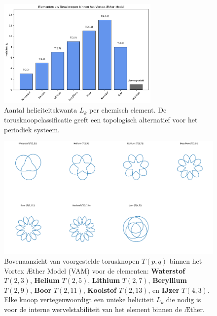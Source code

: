 \begin{figure}[H]
    \centering
    \includegraphics[width=0.7\textwidth]{sections/2_elementenTorusknopen}
    \caption{Aantal heliciteitskwanta $L_k$ per chemisch element. De torusknoopclassificatie geeft een topologisch alternatief voor het periodiek systeem.}
    \label{fig:elementen_torusknoop}
\end{figure}

\begin{figure}[H]
    \centering
    \includegraphics[width=\textwidth]{sections/0_eersteKnopen}
    \caption[Torusknopen voor lichte elementen (bovenaanzicht)]{
        Bovenaanzicht van voorgestelde torusknopen \( T(p, q) \) binnen het Vortex Æther Model (VAM) voor de elementen:
        \textbf{Waterstof} \(T(2,3)\),
        \textbf{Helium} \(T(2,5)\),
        \textbf{Lithium} \(T(2,7)\),
        \textbf{Beryllium} \(T(2,9)\),
        \textbf{Boor} \(T(2,11)\),
        \textbf{Koolstof} \(T(2,13)\), en
        \textbf{IJzer} \(T(4,3)\).
        Elke knoop vertegenwoordigt een unieke heliciteit \( L_k \) die nodig is voor de interne wervelstabiliteit van het element binnen de Æther.
    }
    \label{fig:torusknopen_top}
\end{figure}


